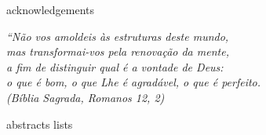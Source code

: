 {acknowledgements}

\begin{epigrafe}
\vspace*{\fill}
\begin{flushright}
  \textit{``Não vos amoldeis às estruturas deste mundo, \\
    mas transformai-vos pela renovação da mente, \\
    a fim de distinguir qual é a vontade de Deus: \\
    o que é bom, o que Lhe é agradável, o que é perfeito.\\
    (Bíblia Sagrada, Romanos 12, 2)}
\end{flushright}
\end{epigrafe}

{abstracts}
{lists}

\cleardoublepage{}
